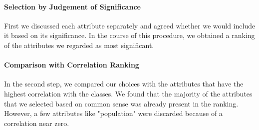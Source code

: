 \paragraph{Selection by Judgement of Significance}
First we discussed each attribute separately and agreed whether we
would include it based on its significance. In the course of this
procedure, we obtained a ranking of the attributes we regarded as most
significant.

\paragraph{Comparison with Correlation Ranking}
In the second step, we compared our choices with the attributes that
have the highest correlation with the classes. We found that the
majority of the attributes that we selected based on common sense was
already present in the ranking. However, a few attributes like
"population" were discarded because of a correlation near zero.

